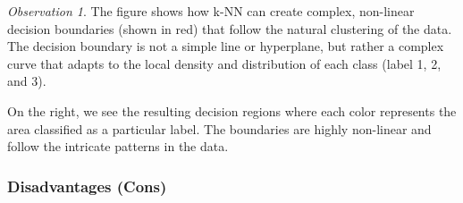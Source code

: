 \documentclass[11pt,a4paper]{article}
\theoremstyle{definition}
\theoremstyle{plain}
\theoremstyle{remark}
\newtheorem*{observation}{Observation}
\begin{document}
\begin{observation}
The figure shows how k-NN can create complex, non-linear decision boundaries (shown in red) that follow the natural clustering of the data. The decision boundary is not a simple line or hyperplane, but rather a complex curve that adapts to the local density and distribution of each class (label 1, 2, and 3).

On the right, we see the resulting decision regions where each color represents the area classified as a particular label. The boundaries are highly non-linear and follow the intricate patterns in the data.
\end{observation}

\subsubsection{Disadvantages (Cons)}
\end{document}
